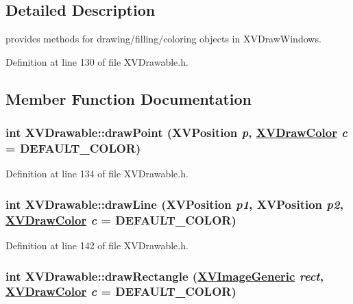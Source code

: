 \subsection{Detailed Description}
provides methods for drawing/filling/coloring objects in XVDraw\-Windows.





Definition at line 130 of file XVDrawable.h.

\subsection{Member Function Documentation}
\label{XVDrawable_a0}
\hypertarget{class_XVDrawable_a0}{
\subsubsection[drawPoint]{\setlength{\rightskip}{0pt plus 5cm}int XVDrawable::draw\-Point (XVPosition {\em p}, \hyperlink{class_XVDrawColor}{XVDraw\-Color} {\em c} = DEFAULT\_\-COLOR)}}




Definition at line 134 of file XVDrawable.h.\label{XVDrawable_a2}
\hypertarget{class_XVDrawable_a2}{
\subsubsection[drawLine]{\setlength{\rightskip}{0pt plus 5cm}int XVDrawable::draw\-Line (XVPosition {\em p1}, XVPosition {\em p2}, \hyperlink{class_XVDrawColor}{XVDraw\-Color} {\em c} = DEFAULT\_\-COLOR)}}




Definition at line 142 of file XVDrawable.h.\label{XVDrawable_a4}
\hypertarget{class_XVDrawable_a4}{
\subsubsection[drawRectangle]{\setlength{\rightskip}{0pt plus 5cm}int XVDrawable::draw\-Rectangle (\hyperlink{class_XVImageGeneric}{XVImage\-Generic} {\em rect}, \hyperlink{class_XVDrawColor}{XVDraw\-Color} {\em c} = DEFAULT\_\-COLOR)}}




